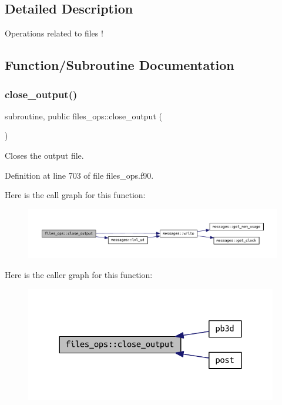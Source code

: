 \subsection{Detailed Description}
Operations related to files ! 

\subsection{Function/\+Subroutine Documentation}
\mbox{\label{namespacefiles__ops_a239cc017150e54eda19a8ccb0ff191cd}} 
\subsubsection{\texorpdfstring{close\+\_\+output()}{close\_output()}}
{\footnotesize\ttfamily subroutine, public files\+\_\+ops\+::close\+\_\+output (\begin{DoxyParamCaption}{ }\end{DoxyParamCaption})}



Closes the output file. 



Definition at line 703 of file files\+\_\+ops.\+f90.

Here is the call graph for this function\+:\nopagebreak
\begin{figure}[H]
\begin{center}
\leavevmode
\includegraphics[width=350pt]{namespacefiles__ops_a239cc017150e54eda19a8ccb0ff191cd_cgraph}
\end{center}
\end{figure}
Here is the caller graph for this function\+:\nopagebreak
\begin{figure}[H]
\begin{center}
\leavevmode
\includegraphics[width=312pt]{namespacefiles__ops_a239cc017150e54eda19a8ccb0ff191cd_icgraph}
\end{center}
\end{figure}
\mbox{\label{namespacefiles__ops_a1e219b1147f109f758d03bef89d540e8}} 
